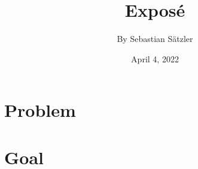 \documentclass[a4paper, 12pt]{book}
\makeatletter
\def\subtitle#1{\gdef\@subtitle{#1}}
\makeatother
\begin{document}
\title{\Large{\textbf{Expos\'e}}}
\subtitle{ML Lifecycle in Recommender Systems: Implementation of MLOps for Collaborative Filtering}
\author{By Sebastian Sätzler}
\date{April 4, 2022}
\maketitle
\let\cleardoublepage\clearpage
\tableofcontents

\chapter{Problem}

\chapter{Goal}
\end{document}
